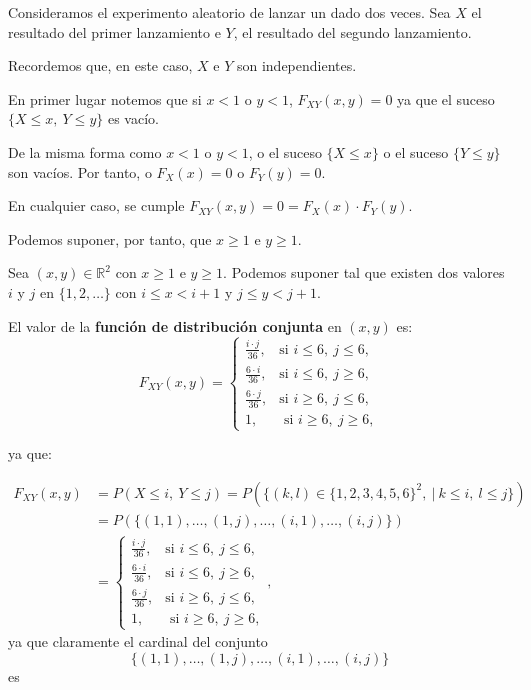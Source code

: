 \documentclass[]{book}
\begin{document}
Consideramos el experimento aleatorio de lanzar un dado dos veces. Sea \(X\) el resultado del primer lanzamiento e \(Y\), el resultado del segundo lanzamiento.

Recordemos que, en este caso, \(X\) e \(Y\) son independientes.

En primer lugar notemos que si \(x<1\) o \(y<1\), \(F_{XY}(x,y)=0\) ya que el suceso \(\{X\leq x,\ Y\leq y\}\) es vacío.

De la misma forma como \(x<1\) o \(y<1\), o el suceso \(\{X\leq x\}\) o el suceso \(\{Y\leq y\}\) son vacíos. Por tanto, o \(F_X(x)=0\) o \(F_Y(y)=0\).

En cualquier caso, se cumple \(F_{XY}(x,y)=0=F_X(x)\cdot F_Y(y)\).

Podemos suponer, por tanto, que \(x\geq 1\) e \(y\geq 1\).

Sea \((x,y)\in \mathbb{R}^2\) con \(x\geq 1\) e \(y\geq 1\). Podemos suponer tal que existen dos valores \(i\) y \(j\) en \(\{1,2,\ldots\}\) con \(i\leq x < i+1\) y \(j\leq y <j+1\).

El valor de la \textbf{función de distribución conjunta} en \((x,y)\) es:
\[
F_{XY}(x,y)=\begin{cases}
\frac{i\cdot j}{36}, & \mbox{si }i\leq 6, \ j\leq 6, \\
\frac{6 \cdot i}{36}, & \mbox{si }i\leq 6,\ j\geq 6,\\
\frac{6\cdot j}{36}, & \mbox{si }i\geq 6,\ j\leq 6,\\
1, & \mbox{ si }i\geq 6,\ j\geq 6,
\end{cases}
\]

ya que:

\[
\begin{array}{rl}
F_{XY}(x,y) & =P(X\leq i,\ Y\leq j)=P(\{(k,l)\in \{1,2,3,4,5,6\}^2,\ |\ k\leq i,\ l\leq j\})\\ & =P(\{(1,1),\ldots,(1,j),\ldots,(i,1),\ldots,(i,j)\})
\\
& =\begin{cases}
\frac{i\cdot j}{36}, & \mbox{si }i\leq 6, \ j\leq 6, \\
\frac{6\cdot i}{36}, & \mbox{si }i\leq 6,\ j\geq 6,\\
\frac{6\cdot j}{36}, & \mbox{si }i\geq 6,\ j\leq 6,\\
1, & \mbox{ si }i\geq 6,\ j\geq 6,
\end{cases},
\end{array}
\]
ya que claramente el cardinal del conjunto
\[\{(1,1),\ldots,(1,j),\ldots,(i,1),\ldots,(i,j)\}\]
es
\end{document}
